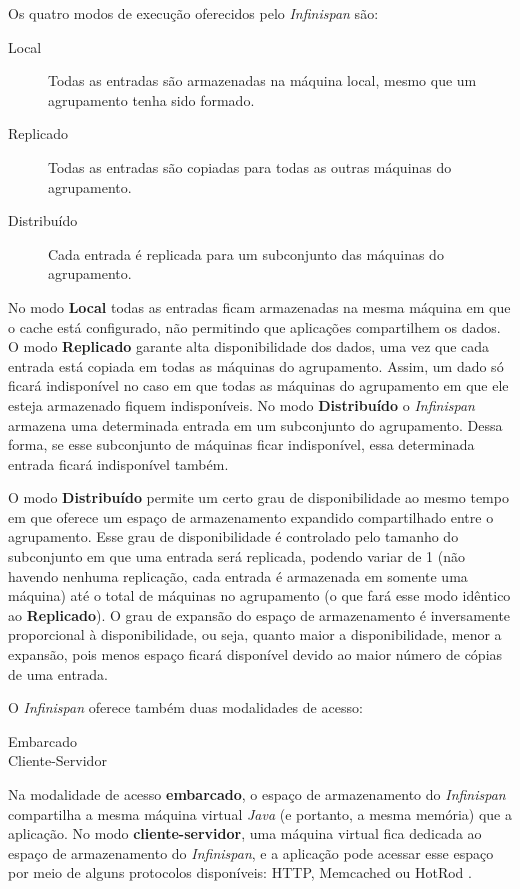 \documentclass[11pt,twoside,a4paper]{book}
\begin{document}
Os quatro modos de execução oferecidos pelo \emph{Infinispan} são:

\begin{description}
	\item[Local] Todas as entradas são armazenadas na máquina local, mesmo que um agrupamento tenha sido formado.
	\item[Replicado] Todas as entradas são copiadas para todas as outras máquinas do agrupamento.
	\item[Distribuído] Cada entrada é replicada para um subconjunto das máquinas do agrupamento.
\end{description}

No modo \textbf{Local} todas as entradas ficam armazenadas na mesma máquina em que o cache está configurado, não permitindo que aplicações compartilhem os dados. O modo \textbf{Replicado} garante alta disponibilidade dos dados, uma vez que cada entrada está copiada em todas as máquinas do agrupamento. Assim, um dado só ficará indisponível no caso em que todas as máquinas do agrupamento em que ele esteja armazenado fiquem indisponíveis. No modo \textbf{Distribuído} o \emph{Infinispan} armazena uma determinada entrada em um subconjunto do agrupamento. Dessa forma, se esse subconjunto de máquinas ficar indisponível, essa determinada entrada ficará indisponível também. 

O modo \textbf{Distribuído} permite um certo grau de disponibilidade ao mesmo tempo em que oferece um espaço de armazenamento expandido compartilhado entre o agrupamento. Esse grau de disponibilidade é controlado pelo tamanho do subconjunto em que uma entrada será replicada, podendo variar de 1 (não havendo nenhuma replicação, cada entrada é armazenada em somente uma máquina) até o total de máquinas no agrupamento (o que fará esse modo idêntico ao \textbf{Replicado}). O grau de expansão do espaço de armazenamento é inversamente proporcional à disponibilidade, ou seja, quanto maior a disponibilidade, menor a expansão, pois menos espaço ficará disponível devido ao maior número de cópias de uma entrada.

O \emph{Infinispan} oferece também duas modalidades de acesso:

\begin{description}
	\item[Embarcado]
	\item[Cliente-Servidor] 
\end{description}

Na modalidade de acesso \textbf{embarcado}, o espaço de armazenamento do \emph{Infinispan} compartilha a mesma máquina virtual \emph{Java} (e portanto, a mesma memória) que a aplicação. No modo \textbf{cliente-servidor}, uma máquina virtual fica dedicada ao espaço de armazenamento do \emph{Infinispan}, e a aplicação pode acessar esse espaço por meio de alguns protocolos disponíveis: HTTP, Memcached ou HotRod \cite{infinispan}.
\end{document}
